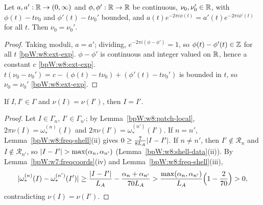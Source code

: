 \begin{lemma}[Winding]\label{bpW:w8:winding}
Let $a,a':\mathbb{R}\to(0,\infty)$ and $\phi,\phi':\mathbb{R}\to\mathbb{R}$ be continuous, $\nu_0,\nu_0'\in\mathbb{R}$, with $\phi(t)-t\nu_0$ and
$\phi'(t)-t\nu_0'$ bounded, and $a(t)e^{-2\pi i\phi(t)}=a'(t)e^{-2\pi i\phi'(t)}$ for all $t$. Then $\nu_0=\nu_0'$.
\end{lemma}
\begin{proof}
\label{stepW:w8:w-mod} Taking moduli, $a=a'$; dividing, $e^{-2\pi i(\phi-\phi')}=1$, so $\phi(t)-\phi'(t)\in\mathbb{Z}$ for all $t$
\ref{bpW:w8:ext-exp}.
\label{stepW:w8:w-const} $\phi-\phi'$ is continuous and integer valued on $\mathbb{R}$, hence a constant $c$ \ref{bpW:w8:ext-exp}.
\label{stepW:w8:w-rate} $t(\nu_0-\nu_0')=c-(\phi(t)-t\nu_0)+(\phi'(t)-t\nu_0')$ is bounded in $t$, so $\nu_0=\nu_0'$ \ref{bpW:w8:ext-exp}.
\end{proof}

\begin{lemma}\label{bpW:w8:nu-injective}
If $I,I'\in\Gamma$ and $\nu(I)=\nu(I')$, then $I=I'$.
\end{lemma}
\begin{proof}
Let $I\in\Gamma_n$, $I'\in\Gamma_{n'}$; by Lemma~\ref{bpW:w8:patch-local}, $2\pi\nu(I)=\omega^{(n)}_*(I)$ and $2\pi\nu(I')=\omega^{(n')}_*(I')$.
\label{stepW:w8:ni-same} If $n=n'$, Lemma~\ref{bpW:w8:freq-shell}(ii) gives $0\ge\frac7{8L_A}\lvert I-I'\rvert$.
\label{stepW:w8:ni-diff} If $n\ne n'$, then $I'\notin\mathcal R_n$ and $I\notin\mathcal R_{n'}$, so
$\lvert I-I'\rvert>\max(\alpha_n,\alpha_{n'})$ (Lemma~\ref{bpW:w8:shell-data}(ii)). By Lemma~\ref{bpW:w7:freqcoords}(iv) and
Lemma~\ref{bpW:w8:freq-shell}(iii),
\[\lvert \omega^{(n)}_*(I)-\omega^{(n')}_*(I')\rvert\ge\frac{\lvert I-I'\rvert}{L_A}-\frac{\alpha_n+\alpha_{n'}}{70L_A}>\frac{\max(\alpha_n,\alpha_{n'})}{L_A}\Bigl(1-\frac2{70}\Bigr)>0,\]
contradicting $\nu(I)=\nu(I')$.
\end{proof}

